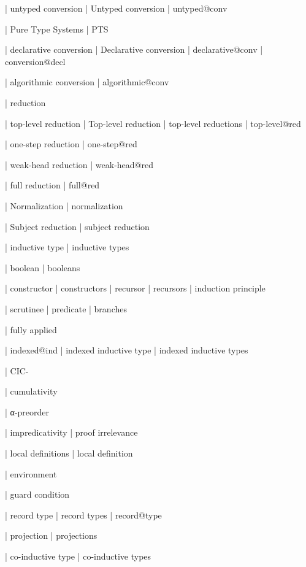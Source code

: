  | untyped conversion
  | Untyped conversion
  | untyped@conv

  | Pure Type Systems
  | PTS

  | declarative conversion
  | Declarative conversion
  | declarative@conv
  | conversion@decl

  | algorithmic conversion
  | algorithmic@conv

  | reduction

  | top-level reduction
  | Top-level reduction
  | top-level reductions
  | top-level@red

  | one-step reduction
  | one-step@red

  | weak-head reduction
  | weak-head@red

  | full reduction
  | full@red

  | Normalization
  | normalization

  | Subject reduction
  | subject reduction

  | inductive type
  | inductive types

  | boolean
  | booleans

  | constructor
  | constructors
  | recursor
  | recursors
  | induction principle

  | scrutinee
  | predicate
  | branches

  | fully applied

  | indexed@ind
  | indexed inductive type
  | indexed inductive types

  | CIC-

  | cumulativity

  | α-preorder

  | impredicativity
  | proof irrelevance

  | local definitions
  | local definition

  | environment

  | guard condition

  | record type
  | record types
  | record@type

  | projection
  | projections

  | co-inductive type
  | co-inductive types
